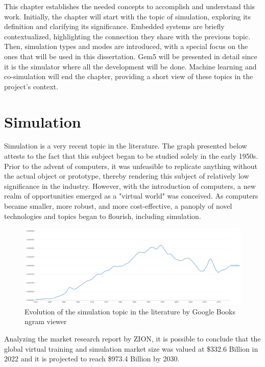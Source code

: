 
This chapter establishes the needed concepts to accomplish and understand this work. Initially, the chapter will start with the topic of 
simulation, exploring its definition and clarifying its significance. Embedded systems are briefly contextualized, highlighting the connection 
they share with 
the previous topic. Then, simulation types and modes are introduced, with a special focus on the ones that will be used in this dissertation. 
Gem5 will be presented in detail since it is the simulator where all the development will be done. Machine learning 
and co-simulation will end the chapter, providing a short view of these topics in the project's context.


\section{Simulation}

Simulation is a very recent topic in the literature. The graph presented below attests to the fact that this subject began to be studied solely 
in the early 1950s. Prior to the advent of computers, it was unfeasible to replicate anything without the actual object or prototype, thereby 
rendering this subject of relatively low significance in the industry. However, with the introduction of computers, a new realm of opportunities 
emerged as a "virtual world" was conceived. As computers became smaller, more robust, and more cost-effective, a panoply of novel technologies 
and topics began to flourish, including simulation. 

\begin{figure}[H]
	\centering
 	\includegraphics[width=0.7\linewidth]{Images/simulation_evolution_graph.png}
 	\caption{Evolution of the simulation topic in the literature by Google Books ngram viewer}
	 \label{fig_simulation_evolution_graph}
\end{figure}

Analyzing the market research report by ZION, it is possible to conclude that the global virtual training and simulation market size was valued 
at \$332.6 Billion in 2022 and it is projected to reach \$973.4 Billion by 2030.  

